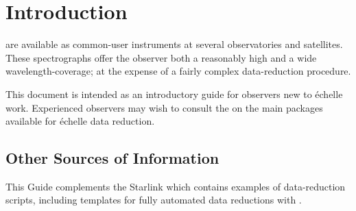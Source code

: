  \newpage
 \begin{latexonly}
   \setlength{\parskip}{0mm}
   \latexonlytoc
   \setlength{\parskip}{\medskipamount}
 \end{latexonly}
\newpage
\renewcommand{\thepage}{\arabic{page}}
\setcounter{page}{1}

\section{\label{se_introduction}Introduction}

  are available as
common-user instruments at several observatories and satellites.  These
spectrographs offer the observer both a reasonably high
 and
a wide wavelength-coverage; at the expense of a fairly complex
data-reduction procedure.

This document is intended as an introductory guide for observers
new to \'{e}chelle work.  Experienced observers may wish to consult
{the }
on the main packages available for \'{e}chelle data reduction.


\subsection{\label{se_other_sources}Other
            Sources of Information}

This Guide complements the Starlink  which contains examples of
data-reduction scripts, including templates for fully automated data
reductions with \@.

